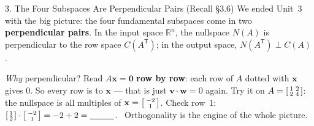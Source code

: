 \documentclass[10pt]{article}
\newcommand{\vv}{\mathbf{v}}
\newcommand{\ww}{\mathbf{w}}
\newcommand{\xx}{\mathbf{x}}
\newcommand{\zero}{\mathbf{0}}
\newcommand{\T}{\mathsf{T}}
\begin{document}
\begin{notesbox}{3. The Four Subspaces Are Perpendicular Pairs (Recall §3.6)}
We ended Unit~3 with the big picture: the four fundamental subspaces come in two
\textbf{perpendicular pairs}. In the input space $\mathbb{R}^n$, the nullspace $N(A)$ is
perpendicular to the row space $C(A^{\T})$; in the output space, $N(A^{\T})\perp C(A)$.

\vspace{3pt}
\emph{Why} perpendicular? Read $A\xx=\zero$ \textbf{row by row}: each row of $A$ dotted with $\xx$
gives $0$. So every row is \blank{3.0cm} to $\xx$ --- that is just $\vv\cdot\ww=0$ again. Try it on
$A=\begin{bsmallmatrix} 1 & 2\\ 2 & 4 \end{bsmallmatrix}$: the nullspace is all multiples of
$\xx=\begin{bsmallmatrix} -2\\1 \end{bsmallmatrix}$. Check row~1:
$\begin{bsmallmatrix} 1\\2 \end{bsmallmatrix}\cdot\begin{bsmallmatrix} -2\\1 \end{bsmallmatrix}
= -2 + 2 = \blank{1.0cm}$. \checkmark\ Orthogonality is the engine of the whole picture.
\end{notesbox}
\end{document}
